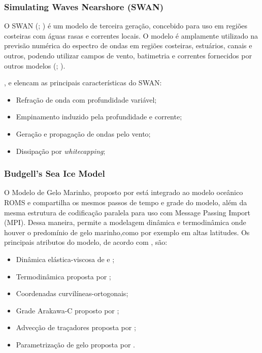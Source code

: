 \documentclass{article}
\begin{document}
\subsubsection{Simulating Waves Nearshore (SWAN)}
\bigskip

O SWAN (\cite{Booij1996}; \cite{Booij1999}) é um modelo de terceira geração, concebido
para uso em regiões costeiras com águas rasas e correntes locais. O modelo é amplamente utilizado na
previsão numérica do espectro de ondas em regiões costeiras, estuários, canais e outros, podendo utilizar
campos de vento, batimetria e correntes fornecidos por outros modelos (\cite{Booij1996}; \cite{Booij1999}).

\textcite{Dasilva2013}, \textcite{Booij1996} e \textcite{Booij1999} elencam as principais características do SWAN:

\begin{itemize}
	\item Refração de onda com profundidade variável;
	\item Empinamento induzido pela profundidade e corrente;
	\item Geração e propagação de ondas pelo vento;
	\item Dissipação por \textit{whitecapping};
\end{itemize}

\subsubsection{Budgell's Sea Ice Model}
\bigskip

O Modelo de Gelo Marinho, proposto por \textcite{Budgell2005} está integrado ao modelo oceânico ROMS
e compartilha os mesmos passos de tempo e grade do modelo, além da mesma estrutura de codificação paralela para 
uso com Message Passing Import (MPI). Dessa maneira, permite a modelagem dinâmica e termodinâmica onde houver o 
predomínio de gelo marinho,como por exemplo em altas latitudes. Os principais atributos do modelo, de acordo com 
\textcite{hedstrom2018}, são:

\begin{itemize}
	\item Dinâmica elástica-viscosa de \textcite{Hunke1997} e \textcite{Hunke2001};
	\item Termodinâmica proposta por \textcite{Mellor1989};
	\item Coordenadas curvilíneas-ortogonais;
	\item Grade Arakawa-C proposto por \textcite{Arakawa1977};
	\item Advecção de traçadores proposta por \textcite{Smolarkiewicz1990};
	\item Parametrização de gelo proposta por \textcite{Lemieux2015}.
\end{itemize}
\end{document}
